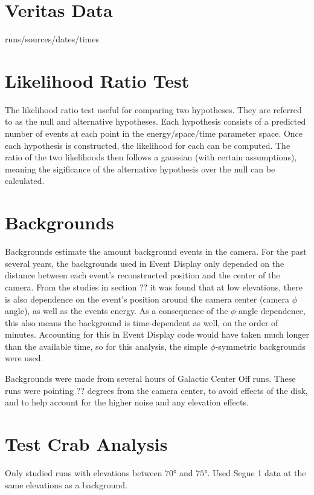 \section{Veritas Data}
runs/sources/dates/times

\section{Likelihood Ratio Test}
The likelihood ratio test useful for comparing two hypotheses.
They are referred to as the null and alternative hypotheses.
Each hypothesis consists of a predicted number of events at each point in the energy/space/time parameter space.
Once each hypothesis is constructed, the likelihood for each can be computed.
The ratio of the two likelihoods then follows a gaussian (with certain assumptions), meaning the sigificance of the alternative hypothesis over the null can be calculated.

\section{Backgrounds}

Backgrounds estimate the amount background events in the camera.
For the past several years, the backgrounds used in Event Display only depended on the distance between each event's reconstructed position and the center of the camera.
From the studies in section ?? it was found that at low elevations, there is also dependence on the event's position around the camera center (camera $\phi$ angle), as well as the events energy.
As a consequence of the $\phi$-angle dependence, this also means the background is time-dependent as well, on the order of minutes.
Accounting for this in Event Display code would have taken much longer than the available time, so for this analysis, the simple $\phi$-symmetric backgrounds were used.

Backgrounds were made from several hours of Galactic Center Off runs.
These runs were pointing ?? degrees from the camera center, to avoid effects of the disk, and to help account for the higher noise and any elevation effects.

\section{Test Crab Analysis}

Only studied runs with elevations between $\ang{70}$ and $\ang{75}$.
Used Segue 1 data at the same elevations as a background.

